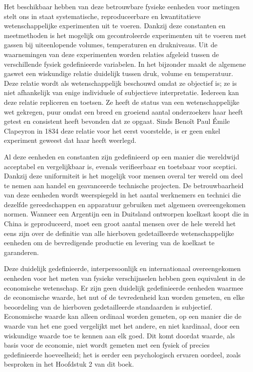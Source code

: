Het beschikbaar hebben van deze betrouwbare fysieke eenheden voor metingen stelt ons in staat systematische, reproduceerbare en kwantitatieve wetenschappelijke experimenten uit te voeren. Dankzij deze constanten en meetmethoden is het mogelijk om gecontroleerde experimenten uit te voeren met gassen bij uiteenlopende volumes, temperaturen en drukniveaus. Uit de waarnemingen van deze experimenten worden relaties afgeleid tussen de verschillende fysiek gedefinieerde variabelen. In het bijzonder maakt de algemene gaswet een wiskundige relatie duidelijk tussen druk, volume en temperatuur. Deze relatie wordt als wetenschappelijk beschouwd omdat ze objectief is; ze is niet afhankelijk van enige individuele of subjectieve interpretatie. Iedereen kan deze relatie repliceren en toetsen. Ze heeft de status van een wetenschappelijke wet gekregen, puur omdat een breed en groeiend aantal onderzoekers haar heeft getest en consistent heeft bevonden dat ze opgaat. Sinds Benoît Paul Émile Clapeyron in 1834 deze relatie voor het eerst voorstelde, is er geen enkel experiment geweest dat haar heeft weerlegd.

Al deze eenheden en constanten zijn gedefinieerd op een manier die wereldwijd acceptabel en vergelijkbaar is, evenals verifieerbaar en toetsbaar voor sceptici. Dankzij deze uniformiteit is het mogelijk voor mensen overal ter wereld om deel te nemen aan handel en geavanceerde technische projecten. De betrouwbaarheid van deze eenheden wordt weerspiegeld in het aantal werknemers en technici die dezelfde gereedschappen en apparatuur gebruiken met algemeen overeengekomen normen. Wanneer een Argentijn een in Duitsland ontworpen koelkast koopt die in China is geproduceerd, moet een groot aantal mensen over de hele wereld het eens zijn over de definitie van alle hierboven gedetailleerde wetenschappelijke eenheden om de bevredigende productie en levering van de koelkast te garanderen.

Deze duidelijk gedefinieerde, interpersoonlijk en internationaal overeengekomen eenheden voor het meten van fysieke verschijnselen hebben geen equivalent in de economische wetenschap. Er zijn geen duidelijk gedefinieerde eenheden waarmee de economische waarde, het nut of de tevredenheid kan worden gemeten, en elke beoordeling van de hierboven gedetailleerde standaarden is subjectief. Economische waarde kan alleen ordinaal worden gemeten, op een manier die de waarde van het ene goed vergelijkt met het andere, en niet kardinaal, door een wiskundige waarde toe te kennen aan elk goed. Dit komt doordat waarde, als basis voor de economie, niet wordt gemeten met een fysiek of precies gedefinieerde hoeveelheid; het is eerder een psychologisch ervaren oordeel, zoals besproken in het Hoofdstuk 2 van dit boek.
